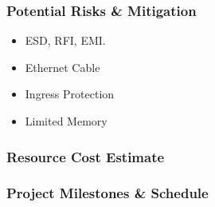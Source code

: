 \begin{frame}
\frametitle{Potential Risks \& Mitigation}


\begin{itemize}
    \item ESD, RFI, EMI.
    \item Ethernet Cable
    \item Ingress Protection
    \item Limited Memory
\end{itemize}

\end{frame}

\begin{frame}
\frametitle{Resource Cost Estimate}


\end{frame}

\begin{frame}
\frametitle{Project Milestones \& Schedule}


\end{frame}
